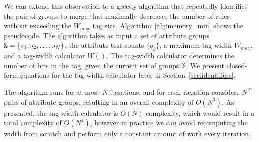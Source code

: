 We can extend this observation to a greedy algorithm that repeatedly
identifies the pair of groups to merge that maximally decreases the
number of rules without exceeding the $W_{max}$ tag size.
Algorithm~\ref{alg:memory_min} shows the pseudocode.  The algorithm
takes as input a set of attribute groups $\mathbb{S} = \{s_1, s_2, \dots,
s_N\}$, the attribute test counts $\{q_k\}$, a maximum tag width
$W_{max}$, and a tag-width calculator $W()$.  The tag-width calculator
determines the number of bits in the tag, given the current set of
groups $\mathbb{S}$.  We present closed-form equations for the tag-width
calculator later in Section~\ref{sec:identifiers}.

The algorithm runs for at most $N$ iterations, and for each iteration considers $N^2$ pairs of attribute groups, resulting in an overall complexity of $O(N^3)$. As presented, the tag width calculator is $O(N)$ complexity, which would result in a total complexity of $O(N^4)$, however in practice we can avoid recomputing the width from scratch and perform only a constant amount of work every iteration. 

